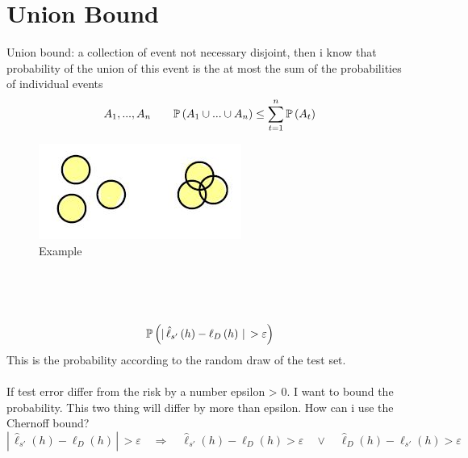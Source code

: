 \documentclass[../main.tex]{subfiles}
\begin{document}
\section{Union Bound}
Union bound: a collection of event not necessary disjoint, then i know
that probability of the union of this event is the at most the sum of the
probabilities of individual events
$$
A_1, ..., A_n \qquad \mathbb{P}\left( A_1 \cup ... \cup A_n \right) \leq \sum_{t=1}^{n} \mathbb{P} \left(A_t\right)
$$
\begin{figure}[h]
    \centering
    \includegraphics[width=0.3\linewidth]{../img/lez7-img1.JPG}
    \caption{Example}
\end{figure}\\
\\\\
$$
\mathbb{P} \left(|\,\hat{\ell}_{s'} \left( h \right) - \ell_D\left( h \right) \, | \, > \varepsilon \right)
$$
This is the probability according to the random draw of the test set.\\
\\
If test error differ from the risk by a number epsilon > 0. I want to bound the
probability. This two thing will differ by more than epsilon. How can i use the
Chernoff bound?
$$
|\,\hat{\ell}_{s'} \left( h \right) - \ell_D\left( h \right) \, | \, > \varepsilon  \quad \Rightarrow \quad 
\hat{\ell}_{s'}\left(h\right)-\ell_D\left(h\right) > \varepsilon \quad \vee \quad
\hat{\ell}_D \left(h\right)-\ell_{s'}\left(h\right) > \varepsilon
$$
\end{document}
